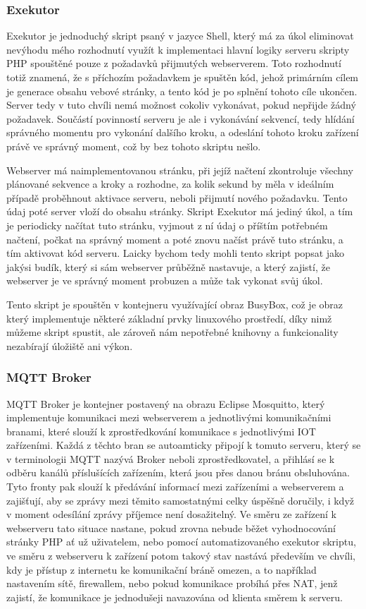 \subsubsection{Exekutor}

Exekutor je jednoduchý skript psaný v jazyce Shell, který má za úkol eliminovat nevýhodu mého rozhodnutí využít k implementaci hlavní logiky serveru skripty PHP spouštěné pouze z požadavků přijmutých webserverem. Toto rozhodnutí totiž znamená, že s příchozím požadavkem je spuštěn kód, jehož primárním cílem je generace obsahu vebové stránky, a tento kód je po splnění tohoto cíle ukončen. Server tedy v tuto chvíli nemá možnost cokoliv vykonávat, pokud nepřijde žádný požadavek. Součástí povinností serveru je ale i vykonávání sekvencí, tedy hlídání správného momentu pro vykonání dalšího kroku, a odeslání tohoto kroku zařízení právě ve správný moment, což by bez tohoto skriptu nešlo.

Webserver má naimplementovanou stránku, při jejíž načtení zkontroluje všechny plánované sekvence a kroky a rozhodne, za kolik sekund by měla v ideálním případě proběhnout aktivace serveru, neboli přijmutí nového požadavku. Tento údaj poté server vloží do obsahu stránky. Skript Exekutor má jediný úkol, a tím je periodicky načítat tuto stránku, vyjmout z ní údaj o příštím potřebném načtení, počkat na správný moment a poté znovu načíst právě tuto stránku, a tím aktivovat kód serveru. Laicky bychom tedy mohli tento skript popsat jako jakýsi budík, který si sám webserver průběžně nastavuje, a který zajistí, že webserver je ve správný moment probuzen a může tak vykonat svůj úkol.

Tento skript je spouštěn v kontejneru využívající obraz BusyBox, což je obraz který implementuje některé základní prvky linuxového prostředí, díky nimž můžeme skript spustit, ale zároveň nám nepotřebné knihovny a funkcionality nezabírají úložiště ani výkon.

\subsubsection{MQTT Broker}

MQTT Broker je kontejner postavený na obrazu Eclipse Mosquitto, který implementuje komunikaci mezi webserverem a jednotlivými komunikačními branami, které slouží k zprostředkování komunikace s jednotlivými IOT zařízeními. Každá z těchto bran se autoamticky připojí k tomuto serveru, který se v terminologii MQTT nazývá Broker neboli zprostředkovatel, a přihlásí se k odběru kanálů příslušících zařízením, která jsou přes danou bránu obsluhována. Tyto fronty pak slouží k předávání informací mezi zařízeními a webserverem a zajišťují, aby se zprávy mezi těmito samostatnými celky úspěšně doručily, i když v moment odesílání zprávy příjemce není dosažitelný. Ve směru ze zařízení k webserveru tato situace nastane, pokud zrovna nebude běžet vyhodnocování stránky PHP ať už uživatelem, nebo pomocí automatizovaného exekutor skriptu, ve směru z webserveru k zařízení potom takový stav nastává především ve chvíli, kdy je přístup z internetu ke komunikační bráně omezen, a to například nastavením sítě, firewallem, nebo pokud komunikace probíhá přes NAT, jenž zajistí, že komunikace je jednodušeji navazována od klienta směrem k serveru.


